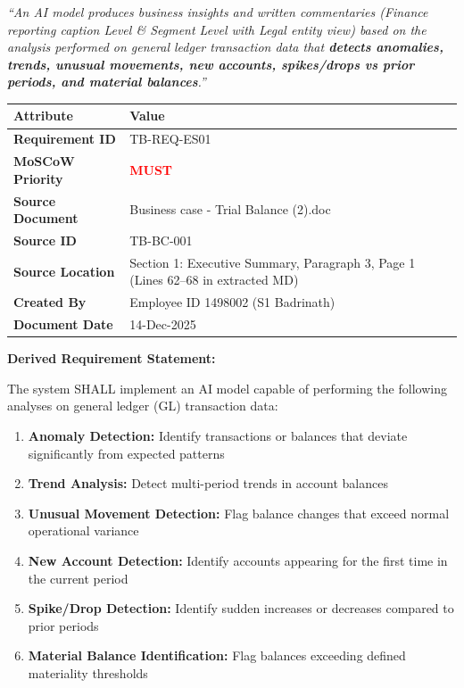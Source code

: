 \documentclass[11pt,a4paper,twoside]{report}
\begin{document}
\begin{tcolorbox}[colback=sourcegreen!5,colframe=sourcegreen!70,title=Source Quotation]
\textit{``An AI model produces business insights and written commentaries
(Finance reporting caption Level \& Segment Level with Legal entity view)
based on the analysis performed on general ledger transaction data that
\textbf{detects anomalies, trends, unusual movements, new accounts,
spikes/drops vs prior periods, and material balances}.''}
\end{tcolorbox}

\begin{tabularx}{\textwidth}{@{}lX@{}}
\toprule
\textbf{Attribute} & \textbf{Value} \\
\midrule
\textbf{Requirement ID} & TB-REQ-ES01 \\
\textbf{MoSCoW Priority} & \textcolor{red}{\textbf{MUST}} \\
\textbf{Source Document} & Business case - Trial Balance (2).doc \\
\textbf{Source ID} & TB-BC-001 \\
\textbf{Source Location} & Section 1: Executive Summary, Paragraph 3, Page 1 (Lines 62--68 in extracted MD) \\
\textbf{Created By} & Employee ID 1498002 (S1 Badrinath) \\
\textbf{Document Date} & 14-Dec-2025 \\
\bottomrule
\end{tabularx}

\vspace{0.5em}
\textbf{Derived Requirement Statement:}

The system SHALL implement an AI model capable of performing the following
analyses on general ledger (GL) transaction data:

\begin{enumerate}[label=(\alph*)]
\item \textbf{Anomaly Detection:} Identify transactions or balances that
deviate significantly from expected patterns
\item \textbf{Trend Analysis:} Detect multi-period trends in account balances
\item \textbf{Unusual Movement Detection:} Flag balance changes that exceed
normal operational variance
\item \textbf{New Account Detection:} Identify accounts appearing for the
first time in the current period
\item \textbf{Spike/Drop Detection:} Identify sudden increases or decreases
compared to prior periods
\item \textbf{Material Balance Identification:} Flag balances exceeding
defined materiality thresholds
\end{enumerate}
\end{document}
